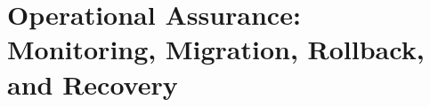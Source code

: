 \chapter{Operational Assurance: Monitoring, Migration, Rollback, and Recovery}\label{ch:C32}








